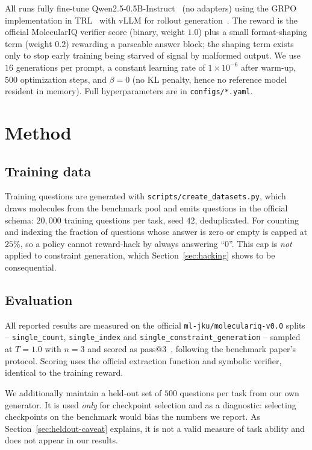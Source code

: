 \documentclass[a4paper,oneside,10pt,ngerman,english]{scrartcl}
\begin{document}
All runs fully fine-tune Qwen2.5-0.5B-Instruct~\cite{bib:2024-qwen25} (no
adapters) using the GRPO implementation in TRL~\cite{bib:trl} with vLLM for
rollout generation~\cite{bib:2023-vllm}. The reward is the official MolecularIQ
verifier score (binary, weight $1.0$) plus a small format-shaping term (weight
$0.2$) rewarding a parseable answer block; the shaping term exists only to stop
early training being starved of signal by malformed output. We use $16$
generations per prompt, a constant learning rate of $1\times10^{-6}$ after
warm-up, $500$ optimization steps, and $\beta=0$ (no KL penalty, hence no
reference model resident in memory). Full hyperparameters are in
\texttt{configs/*.yaml}.

\section{Method}
\label{sec:method}

\subsection{Training data}

Training questions are generated with \texttt{scripts/create\_datasets.py},
which draws molecules from the benchmark pool and emits questions in the
official schema: $20{,}000$ training questions per task, seed $42$, deduplicated.
For counting and indexing the fraction of questions whose answer is zero or
empty is capped at $25\%$, so a policy cannot reward-hack by always answering
``0''. This cap is \emph{not} applied to constraint generation, which
Section~\ref{sec:hacking} shows to be consequential.

\subsection{Evaluation}

All reported results are measured on the official
\texttt{ml-jku/moleculariq-v0.0} splits -- \texttt{single\_count},
\texttt{single\_index} and \texttt{single\_constraint\_generation} -- sampled at
$T=1.0$ with $n=3$ and scored as pass@3~\cite{bib:2021-chen-codex}, following
the benchmark paper's protocol. Scoring uses the official extraction function
and symbolic verifier, identical to the training reward.

We additionally maintain a held-out set of $500$ questions per task from our own
generator. It is used \emph{only} for checkpoint selection and as a diagnostic:
selecting checkpoints on the benchmark would bias the numbers we report. As
Section~\ref{sec:heldout-caveat} explains, it is not a valid measure of task
ability and does not appear in our results.
\end{document}
